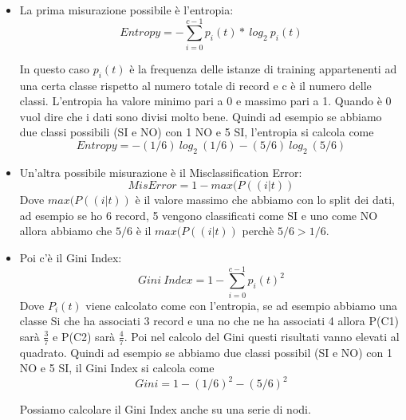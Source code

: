 \documentclass[14pt]{extreport}
\begin{document}
\begin{itemize}
    \item La prima misurazione possibile è l'entropia:
        \begin{equation}
            Entropy = - \sum\limits_{i=0}^{c-1} p_i(t)* \ log_2\ p_i(t)
        \end{equation}
        
    In questo caso $p_i(t)$ è la frequenza delle istanze di training appartenenti ad una certa classe rispetto al numero totale di record e c è il numero delle classi.
    L'entropia ha valore minimo pari a 0 e massimo pari a 1. Quando è 0 vuol dire che i dati sono divisi molto bene. Quindi ad esempio se abbiamo due classi possibili (SI e NO) con 1 NO e 5 SI, l'entropia si calcola come \newline
    \begin{equation}
            Entropy = - (1/6) \ log_2 \ (1/6) - (5/6) \ log_2 \ (5/6)
    \end{equation}
    
    \item Un'altra possibile misurazione è il Misclassification Error:
    \begin{equation}
        MisError = 1 - max(P((i|t))
    \end{equation}
    Dove $max(P((i|t))$ è il valore massimo che abbiamo con lo split dei dati, ad esempio se ho 6 record, 5 vengono classificati come SI e uno come NO allora abbiamo che $5/6$ è il $max(P((i|t))$ perchè $5/6 > 1/6$.

    \item Poi c'è il Gini Index:
        \begin{equation}
            Gini \ Index = 1 - \sum\limits_{i=0}^{c-1} p_i(t)^2
        \end{equation}
    Dove $P_i(t)$ viene calcolato come con l'entropia, se ad esempio abbiamo una classe Si che ha associati 3 record e una no che ne ha associati 4 allora P(C1) sarà $\frac{3}{7}$ e P(C2) sarà $\frac{4}{7}$.
    Poi nel calcolo del Gini questi risultati vanno elevati al quadrato.
    Quindi ad esempio se abbiamo due classi possibil (SI e NO) con 1 NO e 5 SI, il Gini Index si calcola come \newline
    \begin{equation}
            Gini = 1 - (1/6)^2 - (5/6)^2
    \end{equation}
    
    Possiamo calcolare il Gini Index anche su una serie di nodi.
    

\end{itemize}
\end{document}
